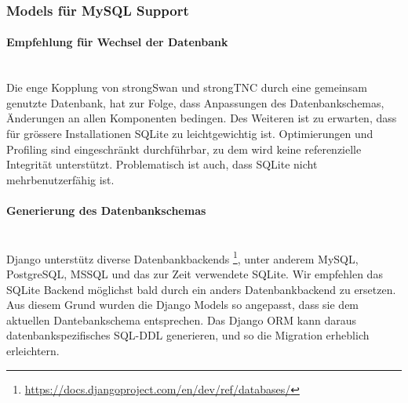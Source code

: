 %
%

\subsubsection{Models für MySQL Support}
\paragraph{Empfehlung für Wechsel der Datenbank} \hspace{0pt} \\
Die enge Kopplung von strongSwan und strongTNC durch eine gemeinsam genutzte
Datenbank, hat zur Folge, dass Anpassungen des Datenbankschemas, Änderungen an
allen Komponenten bedingen. Des Weiteren ist zu erwarten, dass für grössere
Installationen SQLite zu leichtgewichtig ist. Optimierungen und Profiling sind
eingeschränkt durchführbar, zu dem wird keine referenzielle Integrität
unterstützt. Problematisch ist auch, dass SQLite nicht mehrbenutzerfähig ist.

\paragraph{Generierung des Datenbankschemas} \hspace{0pt} \\
Django unterstütz diverse Datenbankbackends
\footnote{\url{https://docs.djangoproject.com/en/dev/ref/databases/}}, unter
anderem MySQL, PostgreSQL, MSSQL und das zur Zeit verwendete SQLite. Wir
empfehlen das SQLite Backend möglichst bald durch ein anders Datenbankbackend zu
ersetzen. Aus diesem Grund wurden die Django Models so angepasst, dass sie dem
aktuellen Dantebankschema entsprechen. Das Django ORM kann daraus
datenbankspezifisches SQL-DDL generieren, und so die Migration erheblich
erleichtern.

